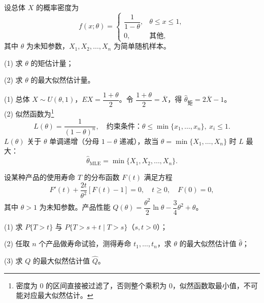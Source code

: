 \documentclass[lang=cn,11pt]{elegantbook}
\begin{document}
\begin{exercise}\label{exer:7-unif-theta}
设总体 \(X\) 的概率密度为
\[
f(x;\theta) = \begin{cases} \dfrac{1}{1-\theta}, & \theta \leq x \leq 1, \\[4pt] 0, & \text{其他}, \end{cases}
\]
其中 \(\theta\) 为未知参数，\(X_1, X_2, \dots, X_n\) 为简单随机样本。\par
(1) 求 \(\theta\) 的矩估计量；\par
(2) 求 \(\theta\) 的最大似然估计量。
\end{exercise}
\begin{solution}
(1) 总体 \(X \sim U(\theta, 1)\)，\(EX = \dfrac{1+\theta}{2}\)。令 \(\dfrac{1+\theta}{2} = \overline{X}\)，得 \(\hat{\theta}_{\text{矩}} = 2\overline{X}-1\)。\\
(2) 似然函数为\footnote{密度为 0 的区间直接被过滤了，否则整个乘积为 0，似然函数取最小值，不可能对应最大似然估计。}
\[
L(\theta) = \frac{1}{(1-\theta)^n},\quad \text{约束条件：}\theta \leq \min\{x_1, \dots, x_n\},\ x_i \leq 1.
\]
\(L(\theta)\) 关于 \(\theta\) 单调递增（分母 \(1-\theta\) 递减），故当 \(\theta = \min\{X_1, \dots, X_n\}\) 时 \(L\) 最大：
\[
\hat{\theta}_{\text{MLE}} = \min\{X_1, X_2, \dots, X_n\}.
\]
\end{solution}




\begin{exercise}\label{exer:7-rayleigh}
设某种产品的使用寿命 \(T\) 的分布函数 \(F(t)\) 满足方程
\[
F'(t) + \frac{2t}{\theta^2}[F(t)-1] = 0,\quad t \geq 0,\quad F(0) = 0,
\]
其中 \(\theta > 1\) 为未知参数。产品性能 \(Q(\theta) = \dfrac{\theta^2}{2}\ln\theta - \dfrac{3}{4}\theta^2 + \theta\)。\par
(1) 求 \(P\{T > t\}\) 与 \(P\{T > s+t \mid T > s\}\)（\(s,t > 0\)）；\par
(2) 任取 \(n\) 个产品做寿命试验，测得寿命 \(t_1, \dots, t_n\)，求 \(\theta\) 的最大似然估计值 \(\hat{\theta}\)；\par
(3) 求 \(Q\) 的最大似然估计值 \(\hat{Q}\)。
\end{exercise}
\end{document}
